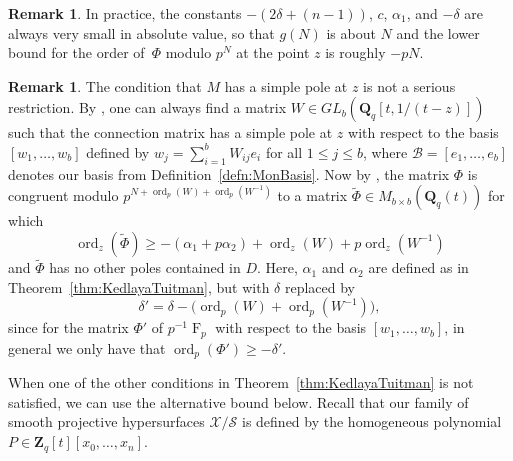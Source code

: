 \documentclass[a4paper,11pt]{article}
\numberwithin{equation}{section}
\newcommand{\ZZ}{\mathbf{Z}} %
\newcommand{\QQ}{\mathbf{Q}} %
\DeclareMathOperator{\ord}{ord}          %
\DeclareMathOperator{\Frob}{F}           %
\providecommand{\cB}{\mathcal{B}} %
\theoremstyle{definition}
\newtheorem{rem}[thm]{Remark}
\begin{document}
\begin{rem}
In practice, the constants $-(2 \delta + (n-1))$, $c$, $\alpha_1$, and $-\delta$ 
are always very small in absolute value, so that $g(N)$ is about $N$ and 
the lower bound for the order of~$\Phi$ modulo $p^N$ at the point $z$ is 
roughly $-pN$.
\end{rem}

\begin{rem} \label{rem:basischange}
The condition that $M$ has a simple pole at $z$ is not a serious restriction. 
By \citep[Theorem 2.1]{Lauder2011}, one can always find a matrix $W \in GL_{b}(\QQ_q[t,1/(t-z)])$
such that the connection matrix has a simple pole at $z$ with respect to the basis 
$[w_1, \dotsc, w_b]$ defined by $w_j = \sum_{i=1}^b W_{ij} e_i$ for all 
$1 \leq j \leq b$, where $\cB=[e_1,\dotsc,e_b]$ denotes our basis from 
Definition~\ref{defn:MonBasis}. Now by \citep[Corollary 2.6]{KedlayaTuitman2012}, 
the matrix $\Phi$ is congruent modulo $p^{N+\ord_p(W)+\ord_p(W^{-1})}$ 
to a matrix $\tilde{\Phi} \in M_{b \times b}(\QQ_q(t))$ for which
\[
\ord_z(\tilde{\Phi}) \geq -(\alpha_1+p \alpha_2)+\ord_z(W)+p\ord_z(W^{-1})
\]
and $\tilde{\Phi}$ has no other poles contained in $D$.
Here, $\alpha_1$ and $\alpha_2$ are defined as in 
Theorem~\ref{thm:KedlayaTuitman}, but with $\delta$ replaced by
\begin{equation*}
\delta' = \delta-\bigl(\ord_p(W)+\ord_p(W^{-1})\bigr), 
\end{equation*}
since for the matrix $\Phi'$ of $p^{-1}\Frob_p$ with respect to the basis 
$[w_1,\dotsc,w_b]$, in general we only have that $\ord_p(\Phi') \geq -\delta'$. 
\end{rem}

When one of the other conditions in Theorem~\ref{thm:KedlayaTuitman} is not satisfied, 
we can use the alternative bound below. Recall that our family of 
smooth projective hypersurfaces $\mathcal{X}/\mathcal{S}$ is defined by the homogeneous 
polynomial $P \in \ZZ_q[t][x_0,\dotsc,x_n]$.
\end{document}
